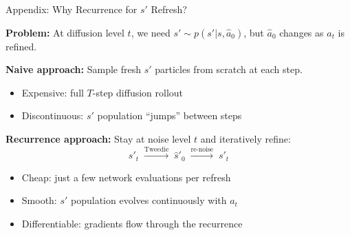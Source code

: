 \documentclass[aspectratio=169]{beamer}
\begin{document}
\begin{frame}{Appendix: Why Recurrence for $s'$ Refresh?}

\textbf{Problem:} At diffusion level $t$, we need $s' \sim p(s'|s, \hat{a}_0)$, but $\hat{a}_0$ changes as $a_t$ is refined.

\vspace{0.5em}
\textbf{Naive approach:} Sample fresh $s'$ particles from scratch at each step.
\begin{itemize}
    \item Expensive: full $T$-step diffusion rollout
    \item Discontinuous: $s'$ population ``jumps'' between steps
\end{itemize}

\vspace{0.5em}
\textbf{Recurrence approach:} Stay at noise level $t$ and iteratively refine:
\[
s'_t \;\xrightarrow{\text{Tweedie}}\; \hat{s}'_0 \;\xrightarrow{\text{re-noise}}\; s'_t
\]

\begin{itemize}
    \item Cheap: just a few network evaluations per refresh
    \item Smooth: $s'$ population evolves continuously with $a_t$
    \item Differentiable: gradients flow through the recurrence
\end{itemize}

\end{frame}
\end{document}
